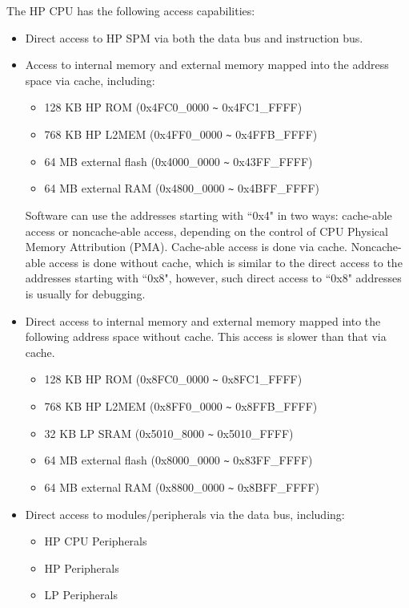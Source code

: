 \documentclass[main\_\_EN.tex]{subfiles}
\begin{document}
The HP CPU has the following access capabilities:
\begin{itemize}
\item Direct access to HP SPM via both the data bus and instruction bus.
\item Access to internal memory and external memory mapped into the address space via cache, including:
    \begin{itemize}
        \item 128 KB HP ROM (0x4FC0\_0000 \verb+~+ 0x4FC1\_FFFF)
        \item 768 KB HP L2MEM (0x4FF0\_0000 \verb+~+ 0x4FFB\_FFFF)
        \item 64 MB external flash (0x4000\_0000 \verb+~+ 0x43FF\_FFFF)
        \item 64 MB external RAM  (0x4800\_0000 \verb+~+ 0x4BFF\_FFFF)
    \end{itemize}
\begin{tiplisting}
Software can use the addresses starting with ``0x4" in two ways: cache-able access or noncache-able access, depending on the control of CPU Physical Memory Attribution (PMA). Cache-able access is done via cache. Noncache-able access is done without cache, which is similar to the direct access to the addresses starting with ``0x8", however, such direct access to ``0x8" addresses is usually for debugging.
\end{tiplisting}
\item Direct access to internal memory and external memory mapped into the following address space without cache. This access is slower than that via cache.
    \begin{itemize}
        \item 128 KB HP ROM (0x8FC0\_0000 \verb+~+ 0x8FC1\_FFFF)
        \item 768 KB HP L2MEM (0x8FF0\_0000 \verb+~+ 0x8FFB\_FFFF)
        \item 32 KB LP SRAM (0x5010\_8000 \verb+~+ 0x5010\_FFFF)
        \item 64 MB external flash (0x8000\_0000 \verb+~+ 0x83FF\_FFFF)
        \item 64 MB external RAM (0x8800\_0000 \verb+~+ 0x8BFF\_FFFF)
    \end{itemize}
\item Direct access to modules/peripherals via the data bus, including:
    \begin{itemize}
        \item HP CPU Peripherals
        \item HP Peripherals
        \item LP Peripherals
    \end{itemize}
\end{itemize}
\end{document}
